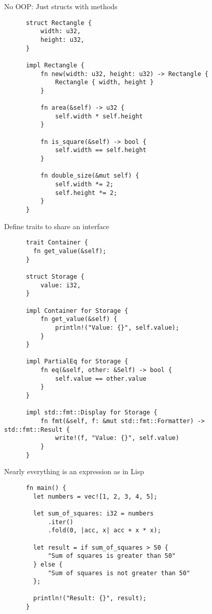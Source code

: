 \documentclass{beamer}
\begin{document}
\begin{frame}[fragile]{No OOP: Just structs with methods}
  \begin{listing}
    \begin{verbatim}
      struct Rectangle {
          width: u32,
          height: u32,
      }
      
      impl Rectangle {
          fn new(width: u32, height: u32) -> Rectangle {
              Rectangle { width, height }
          }
      
          fn area(&self) -> u32 {
              self.width * self.height
          }
      
          fn is_square(&self) -> bool {
              self.width == self.height
          }
      
          fn double_size(&mut self) {
              self.width *= 2;
              self.height *= 2;
          }
      }
    \end{verbatim}
  \end{listing}
\end{frame}

\begin{frame}[fragile]{Define traits to share an interface}
  \begin{listing}
    \begin{verbatim}
      trait Container {
        fn get_value(&self);
      }
      
      struct Storage {
          value: i32,
      }
      
      impl Container for Storage {
          fn get_value(&self) {
              println!("Value: {}", self.value);
          }
      }
      
      impl PartialEq for Storage {
          fn eq(&self, other: &Self) -> bool {
              self.value == other.value
          }
      }
      
      impl std::fmt::Display for Storage {
          fn fmt(&self, f: &mut std::fmt::Formatter) -> std::fmt::Result {
              write!(f, "Value: {}", self.value)
          }
      }
    \end{verbatim}
  \end{listing}
\end{frame}

\begin{frame}[fragile]{Nearly everything is an expression as in Lisp}
  \begin{listing}
    \begin{verbatim}
      fn main() {
        let numbers = vec![1, 2, 3, 4, 5];
    
        let sum_of_squares: i32 = numbers
            .iter()
            .fold(0, |acc, x| acc + x * x);
    
        let result = if sum_of_squares > 50 {
            "Sum of squares is greater than 50"
        } else {
            "Sum of squares is not greater than 50"
        };
    
        println!("Result: {}", result);
      }
    \end{verbatim}
  \end{listing}
\end{frame}
\end{document}
